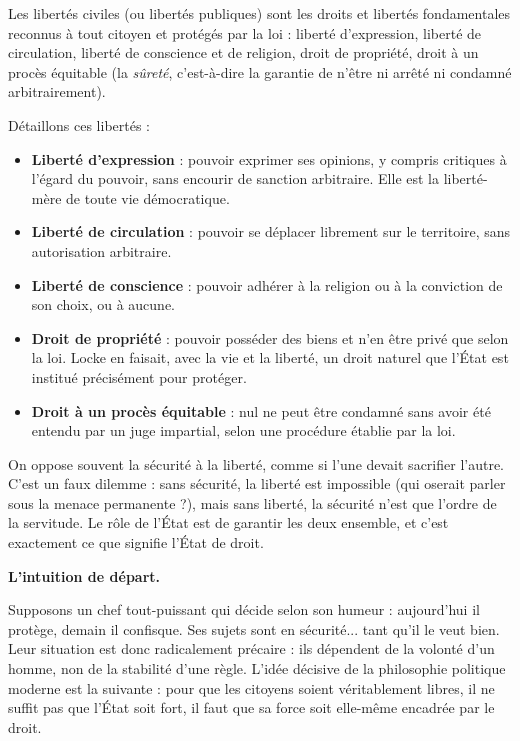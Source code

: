 \documentclass[11pt]{article}
\newcommand{\cle}[1]{{\popxbold\color{popdark}#1}}
\newcounter{popsec}
\newcounter{popsub}
\newcommand{\courssub}[1]{%
  \stepcounter{popsub}%
  \par\vspace{9pt}\noindent{\popxbold\fontsize{11.5}{13}\selectfont\color{popink}{\color{poporange}\thepopsec.\thepopsub}\hspace{6pt}#1}\par\nopagebreak\vspace{4pt}
}
\begin{document}
\begin{definition}
Les \cle{libertés civiles} (ou libertés publiques) sont les droits et libertés fondamentales reconnus à tout citoyen et protégés par la loi : liberté d'expression, liberté de circulation, liberté de conscience et de religion, droit de propriété, droit à un procès équitable (la \emph{sûreté}, c'est-à-dire la garantie de n'être ni arrêté ni condamné arbitrairement).
\end{definition}

Détaillons ces libertés :

\begin{itemize}
\item \textbf{Liberté d'expression} : pouvoir exprimer ses opinions, y compris critiques à l'égard du pouvoir, sans encourir de sanction arbitraire. Elle est la liberté-mère de toute vie démocratique.
\item \textbf{Liberté de circulation} : pouvoir se déplacer librement sur le territoire, sans autorisation arbitraire.
\item \textbf{Liberté de conscience} : pouvoir adhérer à la religion ou à la conviction de son choix, ou à aucune.
\item \textbf{Droit de propriété} : pouvoir posséder des biens et n'en être privé que selon la loi. Locke en faisait, avec la vie et la liberté, un droit naturel que l'État est institué précisément pour protéger.
\item \textbf{Droit à un procès équitable} : nul ne peut être condamné sans avoir été entendu par un juge impartial, selon une procédure établie par la loi.
\end{itemize}

\begin{attention}
On oppose souvent la sécurité à la liberté, comme si l'une devait sacrifier l'autre. C'est un faux dilemme : sans sécurité, la liberté est impossible (qui oserait parler sous la menace permanente ?), mais sans liberté, la sécurité n'est que l'ordre de la servitude. Le rôle de l'État est de garantir les deux ensemble, et c'est exactement ce que signifie l'État de droit.
\end{attention}

\courssub{L'État de droit : le pouvoir soumis au droit}

\textbf{L'intuition de départ.}\par
Supposons un chef tout-puissant qui décide selon son humeur : aujourd'hui il protège, demain il confisque. Ses sujets sont en sécurité... tant qu'il le veut bien. Leur situation est donc radicalement précaire : ils dépendent de la volonté d'un homme, non de la stabilité d'une règle. L'idée décisive de la philosophie politique moderne est la suivante : pour que les citoyens soient véritablement libres, il ne suffit pas que l'État soit fort, il faut que sa force soit elle-même encadrée par le droit.
\end{document}
